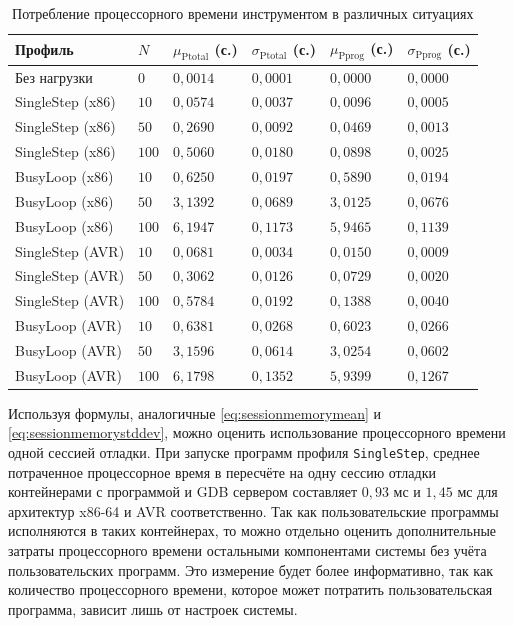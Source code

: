 \documentclass[a4paper,article,14pt]{extarticle}
\begin{document}
\begin{table}[ht]
\small
    \begin{tabular}{p{3cm}p{1cm}p{2.5cm}p{2.5cm}p{2.5cm}p{2.5cm}}
    \toprule
    Профиль & $N$ & $\mu_\mathrm{Ptotal}$ (с.) & $\sigma_\mathrm{Ptotal}$ (с.) &
    $\mu_\mathrm{Pprog}$ (с.) & $\sigma_\mathrm{Pprog}$ (с.) \\
    \midrule
Без нагрузки & $0$ & $0{,}0014$ & $0{,}0001$ & $0{,}0000$ & $0{,}0000$ \\
SingleStep (x86) & $10$ & $0{,}0574$ & $0{,}0037$ & $0{,}0096$ & $0{,}0005$ \\
SingleStep (x86) & $50$ & $0{,}2690$ & $0{,}0092$ & $0{,}0469$ & $0{,}0013$ \\
SingleStep (x86) & $100$ & $0{,}5060$ & $0{,}0180$ & $0{,}0898$ & $0{,}0025$ \\
BusyLoop (x86) & $10$ & $0{,}6250$ & $0{,}0197$ & $0{,}5890$ & $0{,}0194$ \\
BusyLoop (x86) & $50$ & $3{,}1392$ & $0{,}0689$ & $3{,}0125$ & $0{,}0676$ \\
BusyLoop (x86) & $100$ & $6{,}1947$ & $0{,}1173$ & $5{,}9465$ & $0{,}1139$ \\
SingleStep (AVR) & $10$ & $0{,}0681$ & $0{,}0034$ & $0{,}0150$ & $0{,}0009$ \\
SingleStep (AVR) & $50$ & $0{,}3062$ & $0{,}0126$ & $0{,}0729$ & $0{,}0020$ \\
SingleStep (AVR) & $100$ & $0{,}5784$ & $0{,}0192$ & $0{,}1388$ & $0{,}0040$ \\
BusyLoop (AVR) & $10$ & $0{,}6381$ & $0{,}0268$ & $0{,}6023$ & $0{,}0266$ \\
BusyLoop (AVR) & $50$ & $3{,}1596$ & $0{,}0614$ & $3{,}0254$ & $0{,}0602$ \\
BusyLoop (AVR) & $100$ & $6{,}1798$ & $0{,}1352$ & $5{,}9399$ & $0{,}1267$ \\
\bottomrule
    \end{tabular}
\caption{\label{table:cpumeasurements}Потребление процессорного времени инструментом в различных ситуациях}
\normalsize
\end{table}

Используя формулы, аналогичные \ref{eq:sessionmemorymean} и \ref{eq:sessionmemorystddev}, можно оценить использование процессорного времени одной сессией отладки. При запуске программ профиля \texttt{SingleStep}, среднее потраченное процессорное время в пересчёте на одну сессию отладки контейнерами с программой и GDB сервером составляет $0{,}93$ мс и $1{,}45$ мс для архитектур x86-64 и AVR соответственно. Так как пользовательские программы исполняются в таких контейнерах, то можно отдельно оценить дополнительные затраты процессорного времени остальными компонентами системы без учёта пользовательских программ. Это измерение будет более информативно, так как количество процессорного времени, которое может потратить пользовательская программа, зависит лишь от настроек системы.
\end{document}
